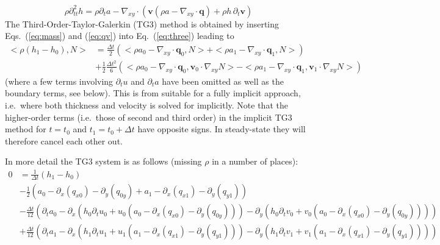 \documentclass[10pt,a4paper]{book}
\newcommand{\p}{\partial}
\begin{document}
\begin{equation}
\rho \p^2_{tt} h = \rho \p_t a-  \nabla_{xy} \cdot ( \bm{v}  (\rho a-\nabla_{xy} \cdot \bm{q}) + \rho h \, \p_t \bm{v})
\label{eq:qv}
\end{equation}
The Third-Order-Taylor-Galerkin (TG3) method is obtained by inserting
Eqs.~(\ref{eq:mass}) and (\ref{eq:qv}) into Eq.~(\ref{eq:three})
leading to
\begin{align} \label{eq:TG3i}
  <\rho (h_1-h_0), N> &=  \frac{\Delta t}{2} \left (  <\rho a_0- \nabla_{xy} \cdot \bm{q}_0 , N> +  <\rho a_1- \nabla_{xy} \cdot \bm{q}_1 , N>   \right ) \\
  &+ \frac{1}{2} \frac{\Delta t^2}{6}
   \left ( <\rho a_0- \nabla_{xy} \cdot \bm{q}_{0} ,  \bm{v}_0 \cdot \nabla_{xy} N>
         -  <\rho a_1- \nabla_{xy} \cdot \bm{q}_{1} ,  \bm{v}_1 \cdot \nabla_{xy} N> \right ) \nonumber
\end{align}
(where a few terms involving $\p_t u$ and $\p_t a$ have been omitted
as well as the boundary terms, see below). This is from suitable for a
fully implicit approach, i.e.\ where both thickness and velocity is
solved for implicitly. Note that the higher-order terms (i.e.\ those
of second and third order) in the implicit TG3 method for $t=t_0$ and
$t_1=t_0+\Delta t$ have opposite signs.  In steady-state they will
therefore cancel each other out.



In more detail the TG3 system is as follows (missing $\rho$ in a number of places):
\begin{align}
\label{eq:uvhT3}
0 &= \frac{1}{\Delta t}(h_1-h_0) \\
&- \frac{1}{2} (a_0 -\p_x( q_{x0}) -\p_y ( q_{0y}) + a_1 -\p_x(q_{x1} ) - \p_y(q_{y1}) ) \nonumber \\
&- \frac{\Delta t}{12} (  \p_t a_0 -\p_x ( h_0 \p_t u_0 + u_0 (a_0-\p_x (q_{x0})-\p_y (q_{0y}))) -\p_y ( h_0 \p_t v_0 + v_0 (a_0-\p_x (q_{x0})-\p_y (q_{0y})))) \nonumber \\
&+ \frac{\Delta t}{12} (  \p_t a_1 -\p_x ( h_1 \p_t u_1 + u_1 (a_1-\p_x (q_{x1})-\p_y (q_{y1}))) -\p_y ( h_1 \p_t v_1 + v_1 (a_1-\p_x (q_{x1})-\p_y (q_{y1})))) \nonumber
\end{align}
\end{document}
